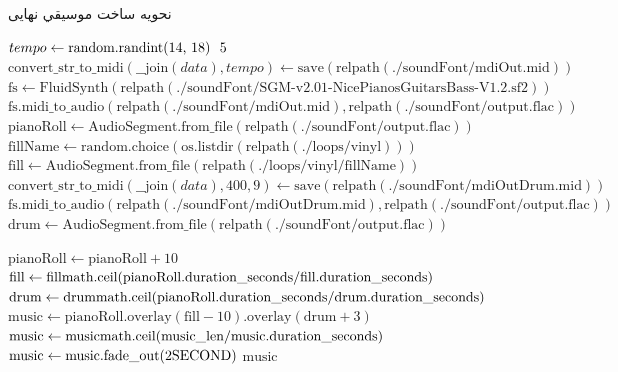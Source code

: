 \begin{LTR}
      \begin{algorithm}[H]
            \caption{نحویه ساخت موسیقي نهایی}
            \label{algo:lofi_music}
            \setmainfont{Times New Roman}
            \begin{algorithmic}[1]
                  \State $tempo \gets \text{random.randint(14, 18) \* 5}$ 
                  \State $\text{convert\_str\_to\_midi}(\text{\_\_join}(data), tempo) \gets \text{save}(\text{relpath}(\text{./soundFont/mdiOut.mid}))$ 
                  \State $\text{fs} \gets \text{FluidSynth}(\text{relpath}(\text{./soundFont/SGM-v2.01-NicePianosGuitarsBass-V1.2.sf2}))$ 
                  \State $\text{fs.midi\_to\_audio}(\text{relpath}(\text{./soundFont/mdiOut.mid}), \text{relpath}(\text{./soundFont/output.flac}))$ 
                  \State $\text{pianoRoll} \gets \text{AudioSegment.from\_file}(\text{relpath}(\text{./soundFont/output.flac}))$ 
                  \State $\text{fillName} \gets \text{random.choice}(\text{os.listdir}(\text{relpath}(\text{./loops/vinyl})))$ 
                  \State $\text{fill} \gets \text{AudioSegment.from\_file}(\text{relpath}(\text{./loops/vinyl/}\text{fillName}))$ 
                  \State $\text{convert\_str\_to\_midi}(\text{\_\_join}(data), 400, 9) \gets \text{save}(\text{relpath}(\text{./soundFont/mdiOutDrum.mid}))$ 
                  \State $\text{fs.midi\_to\_audio}(\text{relpath}(\text{./soundFont/mdiOutDrum.mid}), \text{relpath}(\text{./soundFont/output.flac}))$ 
                  \State $\text{drum} \gets \text{AudioSegment.from\_file}(\text{relpath}(\text{./soundFont/output.flac}))$ 
                  \EndProcedure

                  \State $\text{pianoRoll} \gets \text{pianoRoll} + 10$ 
                  \State $\text{fill} \gets \text{fill} \* \text{math.ceil}(\text{pianoRoll.duration\_seconds} / \text{fill.duration\_seconds})$ 
                  \State $\text{drum} \gets \text{drum} \* \text{math.ceil}(\text{pianoRoll.duration\_seconds} / \text{drum.duration\_seconds})$ 
                  \State $\text{music} \gets \text{pianoRoll}\text{.overlay}(\text{fill} - 10)\text{.overlay}(\text{drum} + 3)$ 
                  \State $\text{music} \gets \text{music} \* \text{math.ceil}(\text{music\_len} / \text{music.duration\_seconds})$ 
                  \State $\text{music} \gets \text{music.fade\_out}(2 \* \text{SECOND})$ 
                  \State \Return $\text{music}$
                  \EndProcedure
            \end{algorithmic}
      \end{algorithm}
\end{LTR}